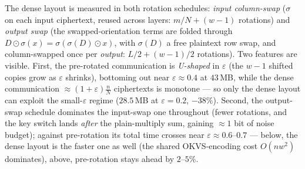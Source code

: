 \documentclass[runningheads]{llncs}
\newcommand{\colswap}{\sigma}                %
\newcommand{\band}{w}                        %
\newcommand{\eps}{\varepsilon}               %
\begin{document}
The dense layout is measured in both rotation schedules: \emph{input column-swap} ($\colswap$ on
each input ciphertext, reused across layers: $m/N+(\band{-}1)$ rotations) and \emph{output swap}
(the swapped-orientation terms are folded through $D\odot\colswap(x)=\colswap(\colswap(D)\odot x)$,
with $\colswap(D)$ a free plaintext row swap, and column-swapped once per \emph{output}:
$L/2+(\band{-}1)/2$ rotations). Two features are visible. First, the pre-rotated communication is
\emph{U-shaped} in $\eps$ (the $\band-1$ shifted copies grow as $\eps$ shrinks), bottoming out
near $\eps\approx0.4$ at $43$\,MB, while the dense communication $\approx(1+\eps)\tfrac nN$
ciphertexts is monotone --- so only the dense layout can exploit the small-$\eps$ regime
($28.5$\,MB at $\eps=0.2$, $-38\%$). Second, the output-swap schedule dominates the input-swap
one throughout (fewer rotations, and the key switch lands \emph{after} the plain-multiply sum,
gaining $\approx1$ bit of noise budget); against pre-rotation its total time crosses near
$\eps\approx0.6$--$0.7$ --- below, the dense layout is the faster one as well (the shared
OKVS-encoding cost $O(n\band^2)$ dominates), above, pre-rotation stays ahead by $2$--$5\%$.
\end{document}
